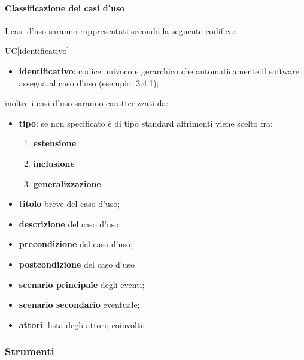 		\paragraph{Classificazione dei casi d'uso}
		I casi d'uso saranno rappresentati secondo la seguente codifica:
		\begin{center}
			UC[identificativo]
		\end{center}
		\begin{itemize}
			\item \textbf{identificativo}: codice univoco e gerarchico che automaticamente il software assegna al caso d'uso (esempio: 3.4.1);
		\end{itemize}
		inoltre i casi d'uso saranno caratterizzati da:
		\begin{itemize}
			\item \textbf{tipo}: se non specificato è di tipo standard altrimenti viene scelto fra:
			\begin{enumerate}
				\item \textbf{estensione}
				\item \textbf{inclusione}
				\item \textbf{generalizzazione}
			\end{enumerate}
			\item \textbf{titolo} breve del caso d'uso;
			\item \textbf{descrizione} del caso d'uso;
			\item \textbf{precondizione} del caso d'uso;
			\item \textbf{postcondizione} del caso d'uso 
			\item \textbf{scenario principale} degli eventi;
			\item \textbf{scenario secondario} eventuale;
			\item \textbf{attori}: lista degli attori; coinvolti;
		\end{itemize}
\subsubsection{Strumenti}
